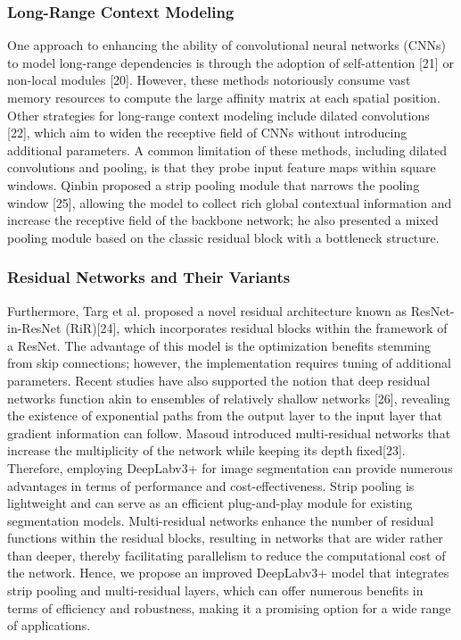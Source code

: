 \documentclass[conference]{IEEEtran}
\begin{document}
\subsubsection{Long-Range Context Modeling}
One approach to enhancing the ability of convolutional neural networks (CNNs) to model long-range dependencies is through the adoption of self-attention [21] or non-local modules [20]. However, these methods notoriously consume vast memory resources to compute the large affinity matrix at each spatial position. Other strategies for long-range context modeling include dilated convolutions [22], which aim to widen the receptive field of CNNs without introducing additional parameters. A common limitation of these methods, including dilated convolutions and pooling, is that they probe input feature maps within square windows. Qinbin proposed a strip pooling module that narrows the pooling window [25], allowing the model to collect rich global contextual information and increase the receptive field of the backbone network; he also presented a mixed pooling module based on the classic residual block with a bottleneck structure.
\subsubsection{Residual Networks and Their Variants}
Furthermore, Targ et al. proposed a novel residual architecture known as ResNet-in-ResNet (RiR)[24], which incorporates residual blocks within the framework of a ResNet. The advantage of this model is the optimization benefits stemming from skip connections; however, the implementation requires tuning of additional parameters. Recent studies have also supported the notion that deep residual networks function akin to ensembles of relatively shallow networks [26], revealing the existence of exponential paths from the output layer to the input layer that gradient information can follow. Masoud introduced multi-residual networks that increase the multiplicity of the network while keeping its depth fixed[23].
Therefore, employing DeepLabv3+ for image segmentation can provide numerous advantages in terms of performance and cost-effectiveness. Strip pooling is lightweight and can serve as an efficient plug-and-play module for existing segmentation models. Multi-residual networks enhance the number of residual functions within the residual blocks, resulting in networks that are wider rather than deeper, thereby facilitating parallelism to reduce the computational cost of the network. Hence, we propose an improved DeepLabv3+ model that integrates strip pooling and multi-residual layers, which can offer numerous benefits in terms of efficiency and robustness, making it a promising option for a wide range of applications.
\end{document}
